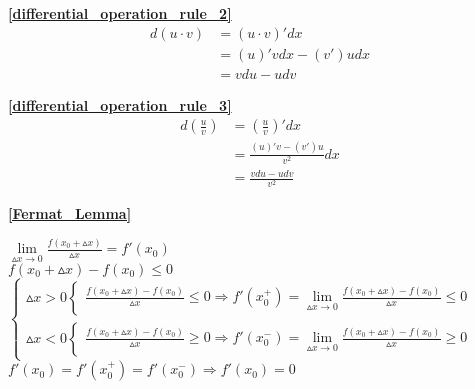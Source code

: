 \textbf{\large \ref{differential_operation_rule_2}}
\begin{displaymath}
    \begin{split}
        d(u\cdot v)&=(u\cdot v)'dx\\
                &=(u)'vdx - (v')udx\\
                &=vdu - udv
    \end{split}
\end{displaymath}

\textbf{\large \ref{differential_operation_rule_3}}
\begin{displaymath}
    \begin{split}
        d\left(\frac{u}{v}\right)&=\left(\frac{u}{v}\right)'dx\\
                &=\frac{(u)'v - (v')u}{v^2}dx\\
                &=\frac{vdu - udv}{v^2}
    \end{split}
\end{displaymath}

\textbf{\large \ref{Fermat_Lemma}}
\begin{center}
    $\lim\limits_{\vartriangle x\to 0}\frac{f(x_0+\vartriangle x)}{\vartriangle x}=f'(x_0)$\\
    $f(x_0+\vartriangle x)-f(x_0)\leqslant 0$\\
    $\begin{cases}
        \vartriangle x>0\begin{cases}
            \frac{f(x_0+\vartriangle x)-f(x_0)}{\vartriangle x}\leqslant 0\Rightarrow f'(x_0^+) =\lim\limits_{\vartriangle x \to 0}\frac{f(x_0+\vartriangle x)-f(x_0)}{\vartriangle x}\leqslant 0
        \end{cases}\\
        \vartriangle x<0\begin{cases}
            \frac{f(x_0+\vartriangle x)-f(x_0)}{\vartriangle x}\geqslant 0\Rightarrow f'(x_0^-) =\lim\limits_{\vartriangle x \to 0}\frac{f(x_0+\vartriangle x)-f(x_0)}{\vartriangle x}\geqslant 0
        \end{cases}
    \end{cases}$\\
    $f'(x_0)=f'(x_0^+)=f'(x_0^-)\Rightarrow f'(x_0)= 0$
\end{center}

